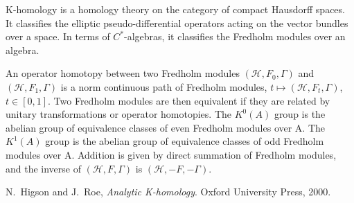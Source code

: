 \documentclass[12pt]{article}
\newcommand*{\hilbert}[1][H]{\mathord{\mathcal{#1}}}
\begin{document}
K-homology is a homology theory on the category of compact Hausdorff spaces.
It classifies the elliptic pseudo-differential operators acting on the
vector bundles over a space.
In terms of $C^*$-algebras, it classifies the Fredholm modules over an algebra.

An operator homotopy between two Fredholm modules $(\hilbert,F_0,\Gamma)$ and $(\hilbert,F_1,\Gamma)$
is a norm continuous path of Fredholm modules, $t \mapsto (\hilbert,F_t,\Gamma)$, $t \in [0,1]$.
Two Fredholm modules are then equivalent if they are related by unitary transformations or operator homotopies.
The $K^0(A)$ group is the abelian group of equivalence classes
of even Fredholm modules over A.
The $K^1(A)$ group is the abelian group of equivalence classes
of odd Fredholm modules over A.
Addition is given by direct summation of Fredholm modules,
and the inverse of $(\hilbert, F, \Gamma)$ is $(\hilbert, -F, -\Gamma)$.

\begin{thebibliography}{10}
N.~Higson and J.~Roe, {\em Analytic K-homology}.
\newblock Oxford University Press, 2000.
\end{thebibliography}
\end{document}
